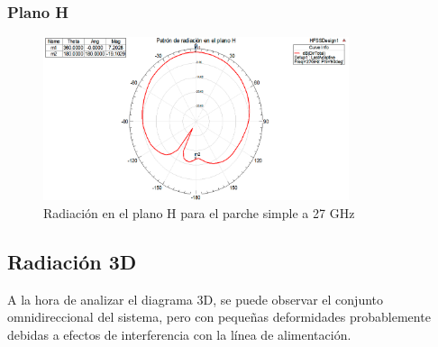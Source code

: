 \subsubsection{Plano H}
\begin{figure}[H]
    \centering
        \includegraphics[width=0.8\textwidth]{archivos/analisis/1x13/5}
        \caption{Radiación en el plano H para el parche simple a 27 GHz}
        \label{fig:H1x13}
\end{figure}

\newpage
\subsection{Radiación 3D}
\par A la hora de analizar el diagrama 3D, se puede observar el conjunto omnidireccional del sistema, pero con pequeñas deformidades probablemente debidas a efectos de interferencia con la línea de alimentación.

